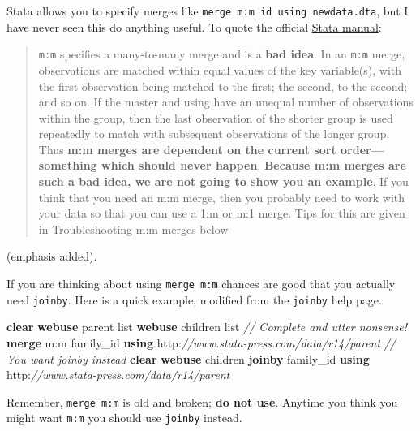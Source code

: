 \documentclass[]{book}
\newenvironment{Shaded}{\begin{snugshade}}{\end{snugshade}}
\newcommand{\CommentTok}[1]{\textcolor[rgb]{0.56,0.35,0.01}{\textit{#1}}}
\newcommand{\FunctionTok}[1]{\textcolor[rgb]{0.00,0.00,0.00}{#1}}
\newcommand{\KeywordTok}[1]{\textcolor[rgb]{0.13,0.29,0.53}{\textbf{#1}}}
\newcommand{\NormalTok}[1]{#1}
\newcommand{\OtherTok}[1]{\textcolor[rgb]{0.56,0.35,0.01}{#1}}
\begin{document}
Stata allows you to specify merges like \texttt{merge\ m:m\ id\ using\ newdata.dta}, but I have never seen this do anything useful. To quote the official \href{https://www.stata.com/manuals13/dmerge.pdf}{Stata manual}:

\begin{quote}
\texttt{m:m} specifies a many-to-many merge and is a \textbf{bad idea}. In an \texttt{m:m} merge, observations are matched within equal values of the key variable(s), with the first observation being matched to the first; the second, to the second; and so on. If the master and using have an unequal number of observations within the group, then the last observation of the shorter group is used repeatedly to match with subsequent observations of the longer group. Thus \textbf{m:m merges are dependent on the current sort order---something which should never happen}. \textbf{Because m:m merges are such a bad idea, we are not going to show you an example}. If you think that you need an m:m merge, then you probably need to work with your data so that you can use a 1:m or m:1 merge. Tips for this are given in Troubleshooting m:m merges below
\end{quote}

(emphasis added).

If you are thinking about using \texttt{merge\ m:m} chances are good that you actually need \texttt{joinby}. Here is a quick example, modified from the \texttt{joinby} help page.

\begin{Shaded}
\begin{Highlighting}[]
  \KeywordTok{clear}
  \KeywordTok{webuse}\NormalTok{ parent}
  \OtherTok{list}
  \KeywordTok{webuse}\NormalTok{ children}
  \OtherTok{list}
  \CommentTok{// Complete and utter nonsense!}
  \KeywordTok{merge} \FunctionTok{m}\NormalTok{:}\FunctionTok{m}\NormalTok{ family_id }\KeywordTok{using}\NormalTok{ http:}\CommentTok{//www.stata-press.com/data/r14/parent }
  \CommentTok{// You want joinby instead}
  \KeywordTok{clear}
  \KeywordTok{webuse}\NormalTok{ children}
  \KeywordTok{joinby}\NormalTok{ family_id }\KeywordTok{using}\NormalTok{ http:}\CommentTok{//www.stata-press.com/data/r14/parent }
\end{Highlighting}
\end{Shaded}

Remember, \texttt{merge\ m:m} is old and broken; \textbf{do not use}. Anytime you think you might want \texttt{m:m} you should use \texttt{joinby} instead.
\end{document}
